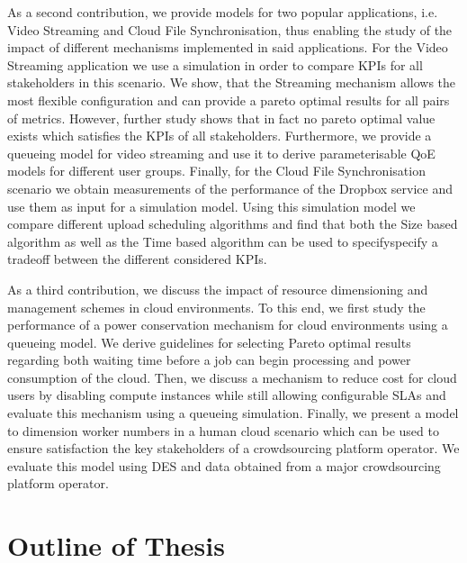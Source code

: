 As a second contribution, we provide models for two popular applications, i.e. Video Streaming and Cloud File Synchronisation, thus enabling the study of the impact of different mechanisms implemented in said applications.
For the Video Streaming application we use a simulation in order to compare \glspl{KPI} for all stakeholders in this scenario.
We show, that the Streaming mechanism allows the most flexible configuration and can provide a pareto optimal results for all pairs of metrics.
However, further study shows that in fact no pareto optimal value exists which satisfies the \glspl{KPI} of all stakeholders.
Furthermore, we provide a queueing model for video streaming and use it to derive parameterisable \gls{QoE} models for different user groups.
Finally, for the Cloud File Synchronisation scenario we obtain measurements of the performance of the Dropbox service and use them as input for a simulation model.
Using this simulation model we compare different upload scheduling algorithms and find that both the Size based algorithm as well as the Time based algorithm can be used to specifyspecify a tradeoff between the different considered \glspl{KPI}.

As a third contribution, we discuss the impact of resource dimensioning and management schemes in cloud environments.
To this end, we first study the performance of a power conservation mechanism for cloud environments using a queueing model.
We derive guidelines for selecting Pareto optimal results regarding both waiting time before a job can begin processing and power consumption of the cloud.
Then, we discuss a mechanism to reduce cost for cloud users by disabling compute instances while still allowing configurable \glspl{SLA} and evaluate this mechanism using a queueing simulation.
Finally, we present a model to dimension worker numbers in a human cloud scenario which can be used to ensure satisfaction the key stakeholders of a crowdsourcing platform operator.
We evaluate this model using \gls{DES} and data obtained from a major crowdsourcing platform operator. 

\section{Outline of Thesis}

